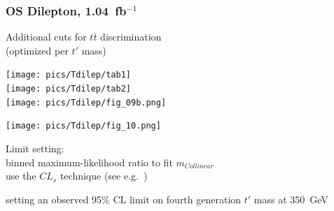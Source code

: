 \documentclass[xcolor=dvipsnames,10pt]{beamer}
\newcommand{\ifb}{~fb$^{-1}$}
\begin{document}
\begin{frame}\frametitle{OS Dilepton, 1.04\ifb~\cite{Aad:2012bt}} %
\footnotesize\centering


\begin{minipage}{.35\textwidth}
\centering

\vspace{.5\baselineskip}
Additional cuts for $t\bar{t}$ discrimination\\\scriptsize
(optimized per $t'$ mass)
\vspace{\baselineskip}

\texttt{[image: pics/Tdilep/tab1]}\\
\texttt{[image: pics/Tdilep/tab2]}\\

\texttt{[image: pics/Tdilep/fig\_09b.png]}

\end{minipage}\begin{minipage}{.65\textwidth}
\centering

\texttt{[image: pics/Tdilep/fig\_10.png]}

Limit setting:\\
binned maximum-likelihood ratio to fit $m_{Collinear}$\\
use the $CL_s$ technique (see e.g.~\cite{Junk:1999kv,Read:2002hq})\\

\vspace{\baselineskip}

setting an observed 95\% CL limit on fourth generation $t'$ mass at \alert{350~GeV}\\

\end{minipage}


\end{frame}


\end{document}
